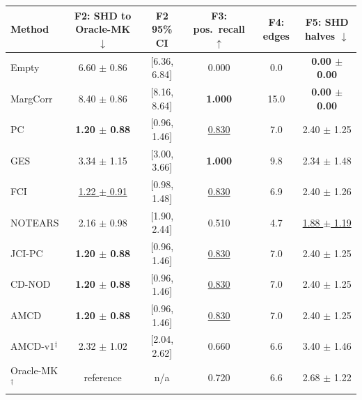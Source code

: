 \begin{tabular}{lccccc}
\toprule
Method & F2: SHD to Oracle-MK $\downarrow$ & F2 95\% CI & F3: pos.\ recall $\uparrow$ & F4: edges & F5: SHD halves $\downarrow$ \\
\midrule
Empty & 6.60 $\pm$ 0.86 & [6.36, 6.84] & 0.000 & 0.0 & \textbf{0.00 $\pm$ 0.00} \\
MargCorr & 8.40 $\pm$ 0.86 & [8.16, 8.64] & \textbf{1.000} & 15.0 & \textbf{0.00 $\pm$ 0.00} \\
PC & \textbf{1.20 $\pm$ 0.88} & [0.96, 1.46] & \underline{0.830} & 7.0 & 2.40 $\pm$ 1.25 \\
GES & 3.34 $\pm$ 1.15 & [3.00, 3.66] & \textbf{1.000} & 9.8 & 2.34 $\pm$ 1.48 \\
FCI & \underline{1.22 $\pm$ 0.91} & [0.98, 1.48] & \underline{0.830} & 6.9 & 2.40 $\pm$ 1.26 \\
NOTEARS & 2.16 $\pm$ 0.98 & [1.90, 2.44] & 0.510 & 4.7 & \underline{1.88 $\pm$ 1.19} \\
JCI-PC & \textbf{1.20 $\pm$ 0.88} & [0.96, 1.46] & \underline{0.830} & 7.0 & 2.40 $\pm$ 1.25 \\
CD-NOD & \textbf{1.20 $\pm$ 0.88} & [0.96, 1.46] & \underline{0.830} & 7.0 & 2.40 $\pm$ 1.25 \\
AMCD & \textbf{1.20 $\pm$ 0.88} & [0.96, 1.46] & \underline{0.830} & 7.0 & 2.40 $\pm$ 1.25 \\
AMCD-v1$^\ddagger$ & 2.32 $\pm$ 1.02 & [2.04, 2.62] & 0.660 & 6.6 & 3.40 $\pm$ 1.46 \\
Oracle-MK$^\dagger$ & reference & n/a & 0.720 & 6.6 & 2.68 $\pm$ 1.22 \\
\bottomrule
\end{tabular}

